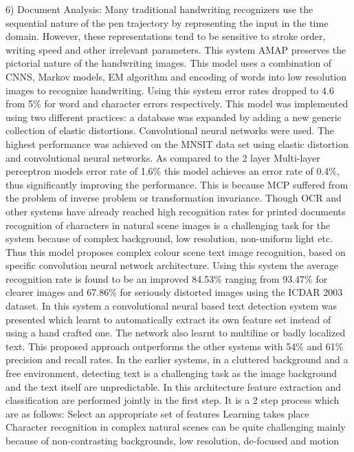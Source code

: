 \documentclass[12pt]{article}
\begin{document}
6) Document Analysis: Many traditional handwriting
recognizers  use the sequential nature of the pen
trajectory by representing the input in the time domain.
However, these representations tend to be sensitive to
stroke order, writing speed and other irrelevant parameters.
This system AMAP preserves the pictorial nature of the
handwriting images. This model  uses a combination of
CNNS, Markov models, EM algorithm and encoding of
words into low resolution images to recognize handwriting.
Using this system error rates dropped to 4.6%
from 5\% for word and character errors respectively. This
model was implemented using two different practices:
a database was expanded by adding a new generic
collection of elastic distortions. Convolutional neural
networks were used. The highest performance was achieved
on the MNSIT data set using elastic distortion and
convolutional neural networks. As compared to the 2 layer
Multi-layer perceptron models error rate of 1.6\% this model
achieves an error rate of 0.4\%, thus significantly improving
the performance. This is because MCP suffered from the
problem of inverse problem or transformation invariance.
Though OCR and other systems have already
reached high recognition rates for printed documents
recognition of characters in natural scene images is a
challenging task for the system because of complex
background, low resolution, non-uniform light etc. Thus
this model proposes complex colour scene text image
recognition, based on specific convolution neural network
architecture. Using this system  the average recognition
rate is found to be an improved 84.53\% ranging from
93.47\% for clearer images and 67.86\% for seriously
distorted images using the ICDAR 2003 dataset. In this
system  a convolutional neural based text detection
system was presented which learnt to automatically extract
its own feature set instead of using a hand crafted one. The
network also learnt to multiline or badly localized text. This
proposed approach outperforms the other systems  with
54\% and 61\% precision and recall rates. In the earlier
systems, in a cluttered background and a free environment,
detecting text is a challenging task as the image background
and the text itself are unpredictable. In this architecture 
feature extraction and classification are performed jointly in
the first step. It is a 2 step process which are as follows:
 Select an appropriate set of features
Learning takes place
Character recognition in complex natural scenes can be
quite challenging mainly because of non-contrasting
backgrounds, low resolution, de-focused and motion
\end{document}
